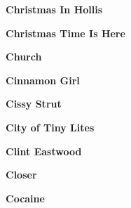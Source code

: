 \newline
\vspace{10pt} 
\begin{center}\textbf{Christmas In Hollis}\end{center}
\newline
\vspace{10pt} 
\begin{center}\textbf{Christmas Time Is Here}\end{center}
\newline
\vspace{10pt} 
\begin{center}\textbf{Church}\end{center}
\newline
\vspace{10pt} 
\begin{center}\textbf{Cinnamon Girl}\end{center}
\newline
\vspace{10pt} 
\begin{center}\textbf{Cissy Strut}\end{center}
\newline
\vspace{10pt} 
\begin{center}\textbf{City of Tiny Lites}\end{center}
\newline
\vspace{10pt} 
\begin{center}\textbf{Clint Eastwood}\end{center}
\newline
\vspace{10pt} 
\begin{center}\textbf{Closer}\end{center}
\newline
\vspace{10pt} 
\begin{center}\textbf{Cocaine}\end{center}
\newline
\vspace{10pt} 
